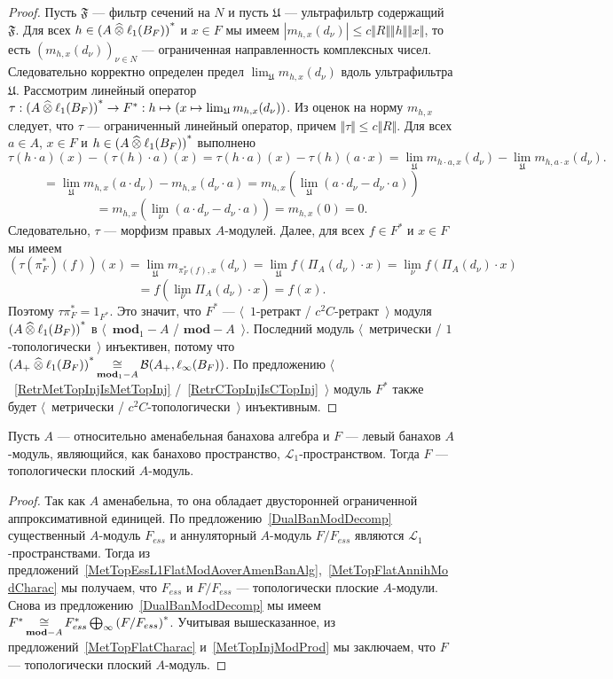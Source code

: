\begin{proof}
Пусть $\mathfrak{F}$ --- фильтр сечений на $N$ и пусть $\mathfrak{U}$ ---
ультрафильтр содержащий $\mathfrak{F}$. Для всех 
$h\in {(A\mathbin{\widehat{\otimes}}\ell_1(B_F))}^*$ и $x\in F$ мы имеем 
$|m_{h,x}(d_\nu)|\leq c\Vert R\Vert\Vert h\Vert\Vert x\Vert$, 
то есть ${(m_{h,x}(d_\nu))}_{\nu\in N}$ ---
ограниченная направленность комплексных чисел. Следовательно корректно определен
предел $\lim_{\mathfrak{U}}m_{h,x}(d_\nu)$ вдоль ультрафильтра $\mathfrak{U}$.
Рассмотрим линейный оператор 
$\tau:{(A\mathbin{\widehat{\otimes}}\ell_1(B_F))}^*\to F^*
:h\mapsto(x\mapsto\lim_{\mathfrak{U}}m_{h,x}(d_\nu))$. Из оценок на норму
$m_{h,x}$ следует, что $\tau$ --- ограниченный линейный оператор, причем
$\Vert\tau\Vert\leq c\Vert R\Vert$. Для всех $a\in A$, $x\in F$ и 
$h\in {(A\mathbin{\widehat{\otimes}}\ell_1(B_F))}^*$ выполнено
$$
\tau(h\cdot a)(x)-(\tau(h)\cdot a)(x)
=\tau(h\cdot a)(x)-\tau(h)(a\cdot x)
=\lim_{\mathfrak{U}}m_{h\cdot a,x}(d_\nu)-\lim_{\mathfrak{U}}m_{h,a\cdot x}(d_\nu).
$$
$$
=\lim_{\mathfrak{U}}m_{h,x}(a\cdot d_\nu)-m_{h,x}(d_\nu\cdot a)
=m_{h,x}\left(\lim_{\mathfrak{U}}(a\cdot d_\nu-d_\nu\cdot a)\right)
$$
$$
=m_{h,x}\left(\lim_{\nu}(a\cdot d_\nu-d_\nu\cdot a)\right)
=m_{h,x}(0)
=0.
$$
Следовательно, $\tau$ --- морфизм правых $A$-модулей. Далее, для всех $f\in F^*$
и $x\in F$ мы имеем
$$
(\tau(\pi_F^*)(f))(x)
=\lim_{\mathfrak{U}}m_{\pi_F^*(f),x}(d_\nu)
=\lim_{\mathfrak{U}}f(\Pi_A(d_\nu)\cdot x)
=\lim_{\nu}f(\Pi_A(d_\nu)\cdot x)
$$
$$
=f\left(\lim_{\nu}\Pi_A(d_\nu)\cdot x\right)
=f(x).
$$
Поэтому $\tau\pi_F^*=1_{F^*}$. Это значит, что $F^*$ --- $\langle$~$1$-ретракт /
 $c^2 C$-ретракт~$\rangle$ модуля ${(A\mathbin{\widehat{\otimes}}\ell_1(B_F))}^*$ в
 $\langle$~$\mathbf{mod}_1-A$ / $\mathbf{mod}-A$~$\rangle$. Последний модуль
 $\langle$~метрически / $1$-топологически~$\rangle$ инъективен, потому что
 ${(A_+\mathbin{\widehat{\otimes}}\ell_1(B_F))}^*
 \mathop{\mathbin{\cong}}\limits_{\mathbf{mod}_1-A}\mathcal{B}(A_+,\ell_\infty(B_F))$.
 По предложению $\langle$~\ref{RetrMetTopInjIsMetTopInj}
 /~\ref{RetrCTopInjIsCTopInj}~$\rangle$ модуль $F^*$ также будет
 $\langle$~метрически / $c^2 C$-топологически~$\rangle$ инъективным.
\end{proof}

\begin{theorem}\label{TopL1FlatModAoverAmenBanAlg} Пусть $A$ --- относительно
аменабельная банахова алгебра и $F$ --- левый банахов $A$-модуль, являющийся,
как банахово пространство, $\mathscr{L}_1$-пространством. Тогда $F$ ---
топологически плоский $A$-модуль.
\end{theorem}
\begin{proof} Так как $A$ аменабельна, то она обладает двусторонней ограниченной
аппроксимативной единицей. По предложению~\ref{DualBanModDecomp} существенный
$A$-модуль $F_{ess}$ и аннуляторный $A$-модуль $F/F_{ess}$ являются
$\mathscr{L}_1$-пространствами. Тогда из
предложений~\ref{MetTopEssL1FlatModAoverAmenBanAlg},~\ref{MetTopFlatAnnihModCharac}
мы получаем, что $F_{ess}$ и $F/F_{ess}$ --- топологически плоские $A$-модули.
Снова из предложению~\ref{DualBanModDecomp} мы имеем
$F^*\mathop{\mathbin{\cong}}\limits_{\mathbf{mod}-A}F_{ess}^*\bigoplus_\infty {(F/F_{ess})}^*$. Учитывая
вышесказанное, из предложений~\ref{MetTopFlatCharac} и~\ref{MetTopInjModProd} мы
заключаем, что $F$ --- топологически плоский $A$-модуль.
\end{proof}

